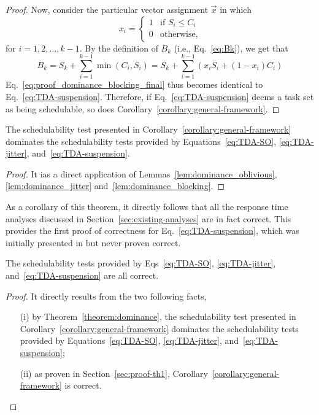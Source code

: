 \begin{proof}
    
    Now, consider the particular vector assignment $\vec{x}$ in which 
  \begin{equation*}
    x_i =
    \begin{cases}
      1 &\mbox{if } S_i \leq    C_i\\
      0 & \mbox{otherwise},
    \end{cases}
  \end{equation*}
  for $i=1,2,\ldots,k-1$. 
    By the definition of $B_k$ (i.e., Eq.~\eqref{eq:Bk}), we get that 
    $$B_k = S_k + \sum_{i=1}^{k-1} \min(C_i, S_i) = S_k + \sum_{i=1}^{k-1} \left(x_i
    S_i + (1-x_i) C_i\right)$$
Eq.~\eqref{eq:proof_dominance_blocking_final} thus becomes identical to Eq.~\eqref{eq:TDA-suspension}. Therefore, if Eq.~\eqref{eq:TDA-suspension} deems a task set as being schedulable, so does Corollary~\ref{corollary:general-framework}. 
\end{proof}

\begin{theorem}
  \label{theorem:dominance}
  The schedulability test presented in Corollary~\ref{corollary:general-framework} dominates the schedulability tests provided by Equations~\eqref{eq:TDA-SO}, \eqref{eq:TDA-jitter}, and~\eqref{eq:TDA-suspension}.
\end{theorem}
\begin{proof}
It ias a direct application of Lemmas~\ref{lem:dominance_oblivious}, \ref{lem:dominance_jitter} and~\ref{lem:dominance_blocking}.
\end{proof}


As a corollary of this theorem, it directly follows that all the response time analyses discussed in Section~\ref{sec:existing-analyses} are in fact correct. This provides the first proof of correctness for Eq.~\eqref{eq:TDA-suspension}, which was initially presented in \cite{Liu:2000:RS:518501} but never proven correct.

\begin{theorem}
  \label{theorem:correctness_soa}
  The schedulability tests provided by Eqs~\eqref{eq:TDA-SO}, \eqref{eq:TDA-jitter}, and~\eqref{eq:TDA-suspension} are all correct.
\end{theorem}
\begin{proof}
It directly results from the two following facts,
\begin{itemize}[leftmargin=0]
\item[(i)] by Theorem~\ref{theorem:dominance}, the schedulability test presented in Corollary~\ref{corollary:general-framework} dominates the schedulability tests provided by Equations~\eqref{eq:TDA-SO}, \eqref{eq:TDA-jitter}, and~\eqref{eq:TDA-suspension};
\item [(ii)] as proven in Section~\ref{sec:proof-th1}, Corollary~\ref{corollary:general-framework} is correct.
\end{itemize}
\end{proof}
